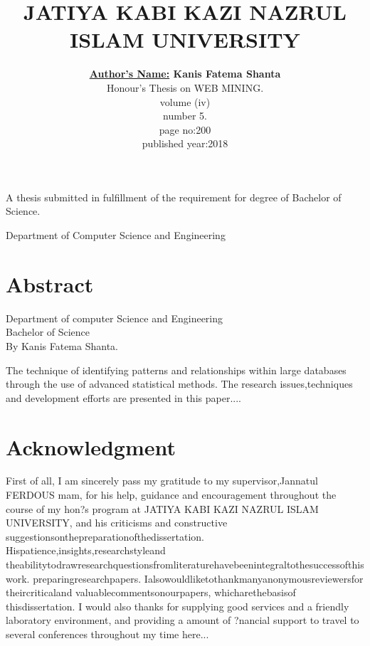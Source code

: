 \documentclass[a4paper,10pt]{article}
\begin{document}
%
   \title{\color{blue}JATIYA KABI KAZI NAZRUL ISLAM UNIVERSITY}
   \author{\textbf{\underline{Author's Name:}\color{green} Kanis Fatema Shanta\vspace{2.0cm} }\\{\vspace{2.00cm} \color{red}Honour's Thesis on WEB MINING.}\\ volume (iv)\\number 5.\\page no:200\\published year:2018}    
   \maketitle
   \begin{center}
   	A thesis submitted in fulfillment of the requirement for  degree of Bachelor of Science.
   \end{center}
 \color{purple}\center Department of Computer Science and Engineering

  
   
 
  \newpage
  \section{Abstract}
  \begin{center}
  	\color{blue}Department of computer Science and Engineering\\
  	Bachelor of Science\\
  	By Kanis Fatema Shanta.
  	\end{center}
  \setlength{\parindent}{10ex}
  \color{black}
  The technique of identifying patterns and relationships within large databases through the use of advanced statistical methods.
  \noindent %
  The research issues,techniques and development efforts are presented in this paper....
  \newpage
  \section{Acknowledgment}
  \begin{center}
  First of all, I am sincerely pass my gratitude to my supervisor,Jannatul FERDOUS mam, for his help, guidance and encouragement throughout the course of my hon?s program at JATIYA KABI KAZI NAZRUL ISLAM UNIVERSITY, and his criticisms and constructive suggestionsonthepreparationofthedissertation. Hispatience,insights,researchstyleand theabilitytodrawresearchquestionsfromliteraturehavebeenintegraltothesuccessofthis work. preparingresearchpapers. Ialsowouldliketothankmanyanonymousreviewersfor theircriticaland valuablecommentsonourpapers, whicharethebasisof thisdissertation. I would also thanks for supplying good services and a friendly laboratory environment, and providing a amount of ?nancial support to travel to several conferences throughout my time here...	
  \end{center}
\newpage
\end{document}
